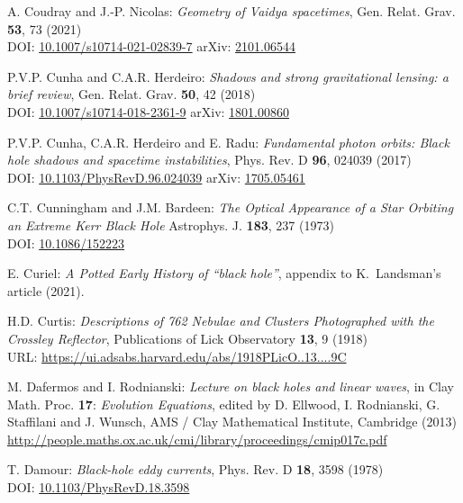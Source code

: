\begin{thebibliography}{123}
A. Coudray and J.-P. Nicolas:
{\em Geometry of Vaidya spacetimes},
Gen. Relat. Grav. {\bf 53}, 73 (2021)\\
DOI: \href{https://doi.org/10.1007/s10714-021-02839-7}{10.1007/s10714-021-02839-7}\hfill
arXiv: \href{https://arxiv.org/abs/2101.06544}{2101.06544}

P.V.P. Cunha and C.A.R. Herdeiro:
{\em Shadows and strong gravitational lensing: a brief review},
Gen. Relat. Grav. {\bf 50}, 42 (2018)\\
DOI: \href{https://doi.org/10.1007/s10714-018-2361-9}{10.1007/s10714-018-2361-9}\hfill
arXiv: \href{https://arxiv.org/abs/1801.00860}{1801.00860}

P.V.P. Cunha, C.A.R. Herdeiro and E. Radu:
{\em Fundamental photon orbits: Black hole shadows and spacetime instabilities},
Phys. Rev. D {\bf 96}, 024039 (2017)\\
DOI: \href{https://doi.org/10.1103/PhysRevD.96.024039}{10.1103/PhysRevD.96.024039}\hfill
arXiv: \href{https://arxiv.org/abs/1705.05461}{1705.05461}

C.T. Cunningham and J.M. Bardeen:
{\em The Optical Appearance of a Star Orbiting an Extreme Kerr Black Hole}
Astrophys. J. {\bf 183}, 237 (1973)\\
DOI: \href{https://doi.org/10.1086/152223}{10.1086/152223}

E. Curiel:
{\em A Potted Early History of ``black hole''},
appendix to K.~Landsman's article \cite{Lands21} (2021).

H.D. Curtis:
{\em Descriptions of 762 Nebulae and Clusters Photographed with the Crossley Reflector},
Publications of Lick Observatory {\bf 13}, 9 (1918)\\
URL: \url{https://ui.adsabs.harvard.edu/abs/1918PLicO..13....9C}

M. Dafermos and I. Rodnianski: {\em Lecture on black holes and linear waves},
in  Clay Math. Proc. {\bf 17}: {\em Evolution Equations}, edited by
D. Ellwood, I. Rodnianski, G. Staffilani and J. Wunsch, AMS / Clay Mathematical Institute,
Cambridge (2013) \\
\url{http://people.maths.ox.ac.uk/cmi/library/proceedings/cmip017c.pdf}

T. Damour: {\em Black-hole eddy currents},
Phys. Rev. D {\bf 18}, 3598 (1978)\\
DOI: \href{https://doi.org/10.1103/PhysRevD.18.3598}{10.1103/PhysRevD.18.3598}


\end{thebibliography}

